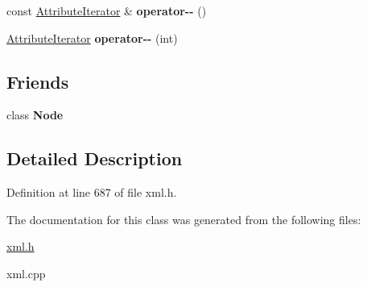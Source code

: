 \begin{DoxyCompactItemize}
\item 
\hypertarget{classphys_1_1xml_1_1AttributeIterator_aa26f070fa194c529285bb094e23215de}{
const \hyperlink{classphys_1_1xml_1_1AttributeIterator}{AttributeIterator} \& {\bfseries operator-\/-\/} ()}
\label{de/d78/classphys_1_1xml_1_1AttributeIterator_aa26f070fa194c529285bb094e23215de}

\item 
\hypertarget{classphys_1_1xml_1_1AttributeIterator_ae46ebed7b404ae085c47984f615a7597}{
\hyperlink{classphys_1_1xml_1_1AttributeIterator}{AttributeIterator} {\bfseries operator-\/-\/} (int)}
\label{de/d78/classphys_1_1xml_1_1AttributeIterator_ae46ebed7b404ae085c47984f615a7597}

\end{DoxyCompactItemize}
\subsection*{Friends}
\begin{DoxyCompactItemize}
\item 
\hypertarget{classphys_1_1xml_1_1AttributeIterator_a6db9d28bd448a131448276ee03de1e6d}{
class {\bfseries Node}}
\label{de/d78/classphys_1_1xml_1_1AttributeIterator_a6db9d28bd448a131448276ee03de1e6d}

\end{DoxyCompactItemize}


\subsection{Detailed Description}


Definition at line 687 of file xml.h.



The documentation for this class was generated from the following files:\begin{DoxyCompactItemize}
\item 
\hyperlink{xml_8h}{xml.h}\item 
xml.cpp\end{DoxyCompactItemize}
